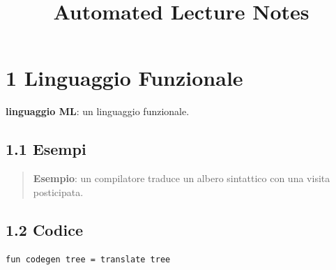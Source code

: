 \documentclass{article}
\begin{document}
\title{Automated Lecture Notes}
\maketitle
\section{1 Linguaggio Funzionale}
\textbf{linguaggio ML}: un linguaggio funzionale.
\subsection{1.1 Esempi}
\begin{quote}\textbf{Esempio}: un compilatore traduce un albero sintattico con una visita posticipata.\end{quote}
\subsection{1.2 Codice}
\begin{verbatim}
fun codegen tree = translate tree
\end{verbatim}
\end{document}
